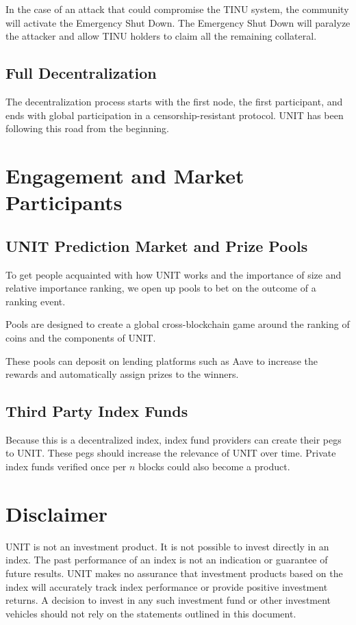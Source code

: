 \documentclass[12pt]{article}
\begin{document}
In the case of an attack that could compromise the TINU system, the community will activate the Emergency Shut Down. The Emergency Shut Down will paralyze the attacker and allow TINU holders to claim all the remaining collateral.

\subsection{Full Decentralization}

The decentralization process starts with the first node, the first participant, and ends with global participation in a censorship-resistant protocol. UNIT has been following this road from the beginning.

\section{Engagement and Market Participants}

\subsection{UNIT Prediction Market and Prize Pools}

To get people acquainted with how UNIT works and the importance of size and relative importance ranking, we open up pools to bet on the outcome of a ranking event.

Pools are designed to create a global cross-blockchain game around the ranking of coins and the components of UNIT.

These pools can deposit on lending platforms such as Aave to increase the rewards and automatically assign prizes to the winners.

\subsection{Third Party Index Funds}

Because this is a decentralized index, index fund providers can create their pegs to UNIT. These pegs should increase the relevance of UNIT over time. Private index funds verified once per $n$ blocks could also become a product. 


\section{Disclaimer}

UNIT is not an investment product. It is not possible to invest directly in an index. The past performance of an index is not an indication or guarantee of future results. UNIT makes no assurance that investment products based on the index will accurately track index performance or provide positive investment returns. A decision to invest in any such investment fund or other investment vehicles should not rely on the statements outlined in this document. 
\end{document}
